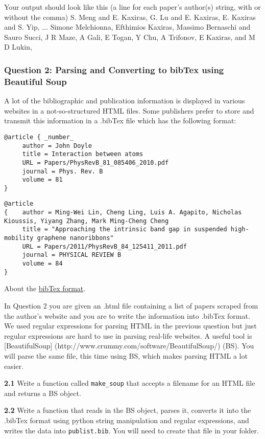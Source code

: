 \documentclass[11pt]{article}
\begin{document}
    Your output should look like this (a line for each paper's author(s)
string, with or without the comma) S. Meng and E. Kaxiras, G. Lu and E.
Kaxiras, E. Kaxiras and S. Yip, ... Simone Melchionna, Efthimios
Kaxiras, Massimo Bernaschi and Sauro Succi, J R Maze, A Gali, E Togan, Y
Chu, A Trifonov, E Kaxiras, and M D Lukin,

    \subsubsection{Question 2: Parsing and Converting to bibTex using
Beautiful
Soup}\label{question-2-parsing-and-converting-to-bibtex-using-beautiful-soup}

A lot of the bibliographic and publication information is displayed in
various websites in a not-so-structured HTML files. Some publishers
prefer to store and transmit this information in a .bibTex file which
has the following format:

\begin{verbatim}
@article { _number_
     author = John Doyle
     title = Interaction between atoms
     URL = Papers/PhysRevB_81_085406_2010.pdf
     journal = Phys. Rev. B
     volume = 81
}
\end{verbatim}

\begin{verbatim}
@article
{    author = Ming-Wei Lin, Cheng Ling, Luis A. Agapito, Nicholas Kioussis, Yiyang Zhang, Mark Ming-Cheng Cheng
     title = "Approaching the intrinsic band gap in suspended high-mobility graphene nanoribbons"
     URL = Papers/2011/PhysRevB_84_125411_2011.pdf
     journal = PHYSICAL REVIEW B
     volume = 84
}
\end{verbatim}

About the \href{http://www.bibtex.org}{bibTex format}.

In Question 2 you are given an .html file containing a list of papers
scraped from the author's website and you are to write the information
into .bibTex format. We used regular expressions for parsing HTML in the
previous question but just regular expressions are hard to use in
parsing real-life websites. A useful tool is {[}BeautifulSoup{]}
(http://www.crummy.com/software/BeautifulSoup/) (BS). You will parse the
same file, this time using BS, which makes parsing HTML a lot easier.

\textbf{2.1} Write a function called \texttt{make\_soup} that accepts a
filename for an HTML file and returns a BS object.

\textbf{2.2} Write a function that reads in the BS object, parses it,
converts it into the .bibTex format using python string manipulation and
regular expressions, and writes the data into \texttt{publist.bib}. You
will need to create that file in your folder.
\end{document}
